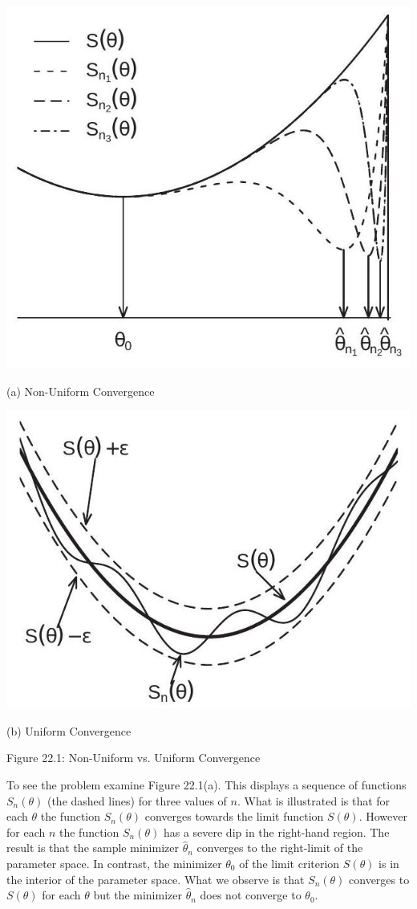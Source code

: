 \documentclass[10pt]{article}
\begin{document}
\includegraphics[max width=\textwidth]{2022_10_23_2c4fe6dc0800a1c87de2g-03}

(a) Non-Uniform Convergence

\includegraphics[max width=\textwidth]{2022_10_23_2c4fe6dc0800a1c87de2g-03(1)}

(b) Uniform Convergence

Figure 22.1: Non-Uniform vs. Uniform Convergence

To see the problem examine Figure 22.1(a). This displays a sequence of functions $S_{n}(\theta)$ (the dashed lines) for three values of $n$. What is illustrated is that for each $\theta$ the function $S_{n}(\theta)$ converges towards the limit function $S(\theta)$. However for each $n$ the function $S_{n}(\theta)$ has a severe dip in the right-hand region. The result is that the sample minimizer $\widehat{\theta}_{n}$ converges to the right-limit of the parameter space. In contrast, the minimizer $\theta_{0}$ of the limit criterion $S(\theta)$ is in the interior of the parameter space. What we observe is that $S_{n}(\theta)$ converges to $S(\theta)$ for each $\theta$ but the minimizer $\widehat{\theta}_{n}$ does not converge to $\theta_{0}$.
\end{document}
